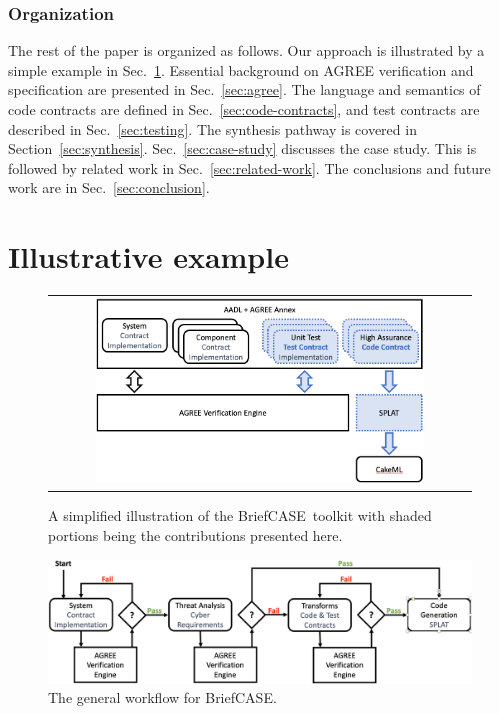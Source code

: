 \documentclass[global,twocolumn]{svjour}
\newcommand{\secref}[1]{Sec.~\ref{#1}}
\newcommand{\brfcs}{BriefCASE}
\newcommand{\agr}{AGREE}
\begin{document}

\subsubsection*{Organization}
The rest of the paper is organized as follows.
%
Our approach is illustrated by a simple example in \secref{sec:example}.
%
Essential background on {\agr} verification and specification are presented in \secref{sec:agree}.
%
The language and semantics of code contracts are defined in \secref{sec:code-contracts}, and test contracts are described in \secref{sec:testing}.
%
The synthesis pathway is covered in Section~\ref{sec:synthesis}.
%
\secref{sec:case-study} discusses the case study.
%
This is followed by related work in \secref{sec:related-work}.
%
The conclusions and future work are in \secref{sec:conclusion}.


\section{Illustrative example}
\label{sec:example}

\begin{figure}
  \begin{center}
    \begin{tabular}{c}
      \includegraphics[width=0.8\textwidth]{flowchart.png} \\
    \end{tabular}
  \end{center}
\caption{A simplified illustration of the \brfcs\ toolkit with shaded portions being the contributions presented here.}
\label{fig:flowchart}
\end{figure}

\begin{figure}
	\begin{center}
	  \includegraphics[width=\textwidth]{./figs/workflow.png}
  	\end{center}
	\caption{The general workflow for \brfcs.}
	\label{fig:workflow}
\end{figure}
\end{document}
